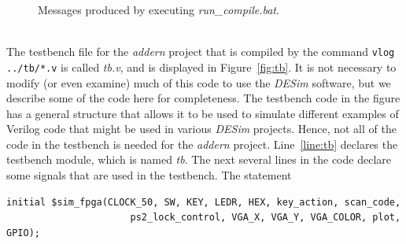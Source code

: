 \documentclass[epsfig,10pt,fullpage]{article} \addtolength{\textwidth}{1.5in}
\begin{document}
\begin{figure}[t]
	\begin{center}
        \setlength{\fboxsep}{0pt}
	\end{center}
          \caption{Messages produced by executing {\it run\_compile.bat}.}
	\label{fig:compile}
\end{figure}
\newpage
~\\
\noindent
The testbench file for the {\it addern} project that is compiled by the command 
\texttt{vlog ../tb/*.v} is called {\it tb.v}, and is displayed in Figure~\ref{fig:tb}. 
It is not necessary to modify (or even examine) much of this code to use the {\it
DESim} software, but we describe some of the code here for completeness.
The testbench code in the figure has a general structure that 
allows it to be used to simulate different
examples of Verilog code that might be used in various {\it DESim} projects. Hence, not
all of the code in the testbench is needed for the {\it addern} project.  Line~\ref{line:tb} 
declares the testbench module, which is named {\it tb}. 
The next several lines in the code declare some signals that are used in the testbench. 
The statement

\lstset{language=Verilog,numbers=none,escapechar=|}
\begin{lstlisting}[]
    initial $sim_fpga(CLOCK_50, SW, KEY, LEDR, HEX, key_action, scan_code, 
                      ps2_lock_control, VGA_X, VGA_Y, VGA_COLOR, plot, GPIO);
\end{lstlisting}
\end{document}

